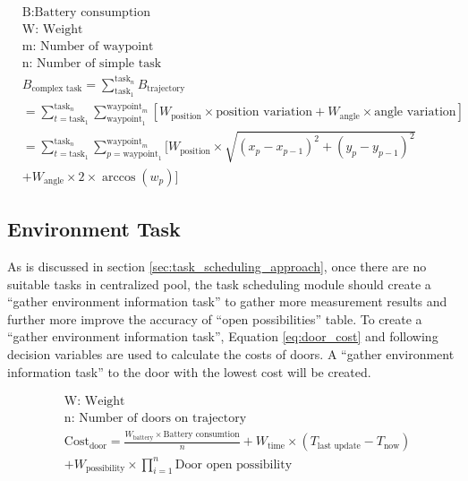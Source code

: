 \begin{equation}
\begin{aligned}
\label{eq:battery_consumption}
& \mbox{B:Battery consumption } \\
& \mbox{W: Weight } \\
& \mbox{m: Number of waypoint } \\
& \mbox{n: Number of simple task} \\
& B_{\mbox{complex task}} = \sum_{\mbox{task}_1}^{\mbox{task}_n} B_{\mbox{trajectory}} \\
& = \sum_{t = \mbox{task}_1}^{\mbox{task}_n} \sum_{\mbox{waypoint}_1}^{\mbox{waypoint}_m} [W_{\mbox{position}} \times \mbox{position variation}+W_{\mbox{angle}}  \times \mbox{angle variation}]\\
& = \sum_{t = \mbox{task}_1}^{\mbox{task}_n} \sum_{p = \mbox{waypoint}_1}^{\mbox{waypoint}_m} [ W_{\mbox{position}} \times \sqrt{(x_p-x_{p-1} )^2+(y_p-y_{p-1} )^2} \\
&   + W_{\mbox{angle}} \times 2 \times \arccos(w_p)] 
\end{aligned}
\end{equation}


\subsection{Environment Task}
As is discussed in section \ref{sec:task_scheduling_approach}, once there are no suitable tasks in centralized pool, the task scheduling module should create a ``gather environment information task'' to gather more measurement results and further more improve the accuracy of ``open possibilities'' table.
To create a ``gather environment information task'', Equation \ref{eq:door_cost} and following decision variables are used to calculate the costs of doors. A ``gather environment information task'' to the door with the lowest cost will be created.

\begin{equation}
	\label{eq:door_cost}
	\begin{aligned}
	& \mbox{W: Weight } \\
	& \mbox{n: Number of doors on trajectory} \\	
	& \mbox{Cost}_{\mbox{door}} = \frac{W_{\mbox{battery}} \times \mbox{Battery consumtion}}{n} + W_{\mbox{time}} \times (T_{\mbox{last update}} - T_{\mbox{now}}) \\
	& + W_{\mbox{possibility}} \times \prod\limits_{i=1}^n \mbox{Door open possibility}
	\end{aligned}
\end{equation}

